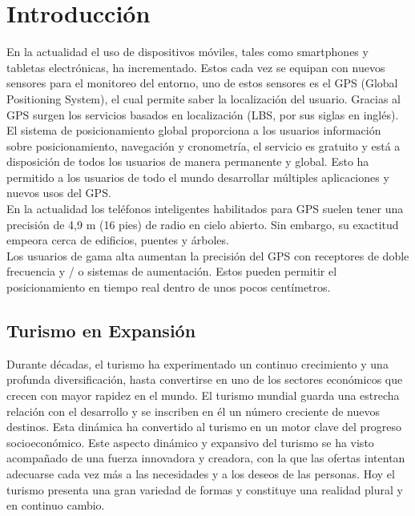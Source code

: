 \chapter{Introducción}

En la actualidad el uso de dispositivos móviles, tales como smartphones y tabletas electrónicas, ha incrementado. Estos cada vez se equipan con nuevos sensores para el monitoreo del entorno, uno de estos sensores es el GPS (Global Positioning System), el cual permite saber la localización del usuario. Gracias al GPS surgen los servicios basados en localización (LBS, por sus siglas en inglés).\\

El sistema de posicionamiento global proporciona a los usuarios información sobre posicionamiento, navegación y cronometría, el servicio es gratuito y está a disposición de todos los usuarios de manera permanente y global. Esto  ha permitido a los usuarios de todo el mundo desarrollar múltiples aplicaciones y nuevos usos del GPS.\\

En la actualidad los teléfonos inteligentes habilitados para GPS suelen tener una precisión de 4,9 m (16 pies) de radio en cielo abierto. Sin embargo, su exactitud empeora cerca de edificios, puentes y árboles.\\

Los usuarios de gama alta aumentan la precisión del GPS con receptores de doble frecuencia y / o sistemas de aumentación. Estos pueden permitir el posicionamiento en tiempo real dentro de unos pocos centímetros.\cite{gps}




\section{Turismo en Expansión}



Durante décadas, el turismo ha experimentado un continuo crecimiento y una profunda diversificación, hasta convertirse en uno de los sectores económicos que crecen con mayor rapidez en el mundo. El turismo mundial guarda una estrecha relación con el desarrollo y se inscriben en él un número creciente de nuevos destinos. Esta dinámica ha convertido al turismo en un motor clave del progreso socioeconómico.
Este aspecto dinámico y expansivo del turismo se ha visto acompañado de una fuerza innovadora y creadora, con la que las ofertas intentan adecuarse cada vez más a las necesidades y a los deseos de las personas. Hoy el turismo presenta una gran variedad de formas y constituye una realidad plural y en continuo cambio.

